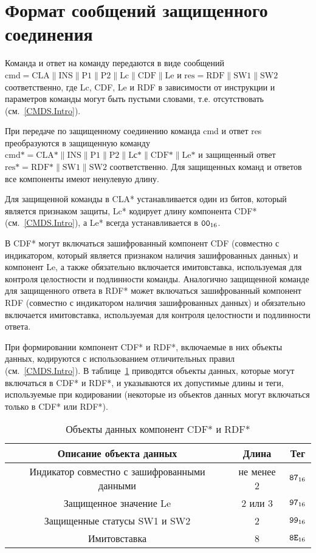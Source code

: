\section{Формат сообщений защищенного соединения}
\label{CMDS.SM}

Команда и ответ на команду передаются в виде сообщений 
$\text{cmd} = \text{CLA} \parallel \text{INS} \parallel \text{P1} \parallel 
\text{P2} \parallel \text{Lc} \parallel \text{CDF} \parallel \text{Le}$ и 
$\text{res} = \text{RDF} \parallel \text{SW1} \parallel \text{SW2}$ 
соответственно, где 
Lc, CDF, Le и RDF в зависимости от инструкции и параметров команды могут 
быть пустыми словами, т.е. отсутствовать (см.~\ref{CMDS.Intro}). 

При передаче по защищенному соединению команда cmd и ответ res 
преобразуются в защищенную команду 
$\text{cmd*} = \text{CLA*} \parallel \text{INS} \parallel \text{P1} 
\parallel \text{P2} \parallel \text{Lс*} \parallel \text{CDF*} 
\parallel \text{Le*}$ и защищенный ответ 
$\text{res*} = \text{RDF*} \parallel \text{SW1} \parallel \text{SW2}$ 
соответственно. Для защищенных команд и ответов все компоненты имеют 
ненулевую длину. 

Для защищенной команды в CLA* устанавливается один из битов, который 
является признаком защиты, Lc* кодирует длину компонента CDF* (см.~\ref{CMDS.Intro}), 
а Le* всегда устанавливается в $\texttt{00}_{16}$.  

В CDF* могут включаться зашифрованный компонент CDF (совместно с 
индикатором, который является признаком наличия зашифрованных данных) и 
компонент Le, а также обязательно включается имитовставка, используемая 
для контроля целостности и подлинности команды.  Аналогично защищенной 
команде для защищенного ответа в RDF* может включаться зашифрованный 
компонент RDF (совместно с индикатором наличия зашифрованных данных) и 
обязательно включается имитовставка, используемая для контроля 
целостности и подлинности ответа. 

При формировании компонент CDF* и RDF*, включаемые в них объекты данных, 
кодируются с использованием отличительных правил (см.~\ref{CMDS.Intro}). 
В таблице~\ref{Table.CMDS.CDFRDF} 
приводятся объекты данных, которые могут включаться в CDF* и RDF*, и 
указываются их допустимые длины и теги, используемые при кодировании 
(некоторые из объектов данных могут включаться только в CDF* или RDF*). 

\begin{table}[h]
\caption{Объекты данных компонент CDF* и RDF*}
\label{Table.CMDS.CDFRDF}
\begin{tabular}{|c|c|c|}
\hline
Описание объекта данных & Длина & Тег \\
\hline
\hline
Индикатор совместно с зашифрованными данными & не менее 2 & $\texttt{87}_{16}$ \\
\hline
Защищенное значение Le & 2 или 3 & $\texttt{97}_{16}$\\
\hline
Защищенные статусы SW1 и SW2 & 2 & $\texttt{99}_{16}$ \\
\hline      
Имитовставка & 8 & $\texttt{8E}_{16}$ \\
\hline
\end{tabular}
\end{table}

